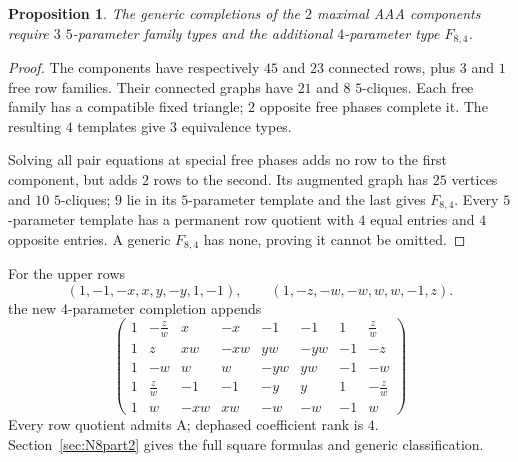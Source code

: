 \documentclass[11pt,a4paper]{article}
\newtheorem{proposition}[theorem]{Proposition}
\theoremstyle{plain}
\theoremstyle{definition}
\numberwithin{equation}{section}
\begin{document}
\label{sec:correction}
\begin{proposition}
The generic completions of the $2$ maximal AAA components require $3$ $5$-parameter family types and the additional $4$-parameter type $F_{8,4}$.
\end{proposition}
\begin{proof}
The components have respectively $45$ and $23$ connected rows, plus $3$ and $1$ free row families. Their connected graphs have $21$ and $8$ $5$-cliques. Each free family has a compatible fixed triangle; $2$ opposite free phases complete it. The resulting $4$ templates give $3$ equivalence types.

Solving all pair equations at special free phases adds no row to the first component, but adds $2$ rows to the second. Its augmented graph has $25$ vertices and $10$ $5$-cliques; $9$ lie in its $5$-parameter template and the last gives $F_{8,4}$. Every $5$-parameter template has a permanent row quotient with $4$ equal entries and $4$ opposite entries. A generic $F_{8,4}$ has none, proving it cannot be omitted.
\end{proof}
For the upper rows
$$
 (1,-1,-x,x,y,-y,1,-1),\qquad
 (1,-z,-w,-w,w,w,-1,z).
$$
the new $4$-parameter completion appends
$$
\begin{pmatrix}
1 & -\frac{z}{w} & x & -x & -1 & -1 & 1 & \frac{z}{w} \\
1 & z & xw & -xw & yw & -yw & -1 & -z \\
1 & -w & w & w & -yw & yw & -1 & -w \\
1 & \frac{z}{w} & -1 & -1 & -y & y & 1 & -\frac{z}{w} \\
1 & w & -xw & xw & -w & -w & -1 & w
\end{pmatrix}
$$
Every row quotient admits A; dephased coefficient rank is $4$. Section~\ref{sec:N8part2} gives the full square formulas and generic classification.
\end{document}
